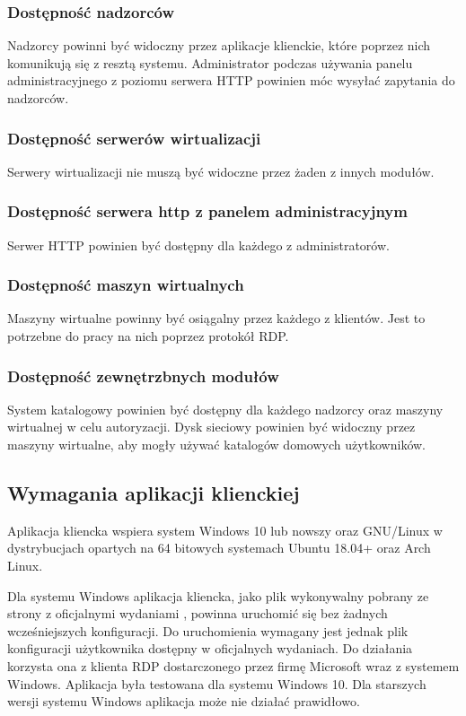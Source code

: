 \documentclass[../opis-rozwiazania.tex]{subfiles}
\begin{document}
\subsubsection{Dostępność nadzorców}
Nadzorcy powinni być widoczny przez aplikacje klienckie, które poprzez nich komunikują się z resztą systemu.
Administrator podczas używania panelu administracyjnego z poziomu serwera HTTP powinien móc wysyłać zapytania do nadzorców.

\subsubsection{Dostępność serwerów wirtualizacji}
Serwery wirtualizacji nie muszą być widoczne przez żaden z innych modułów.

\subsubsection{Dostępność serwera http z panelem administracyjnym}
Serwer HTTP powinien być dostępny dla każdego z administratorów.

\subsubsection{Dostępność maszyn wirtualnych}
Maszyny wirtualne powinny być osiągalny przez każdego z klientów.
Jest to potrzebne do pracy na nich poprzez protokół RDP.

\subsubsection{Dostępność zewnętrzbnych modułów}
System katalogowy powinien być dostępny dla każdego nadzorcy oraz maszyny wirtualnej w celu autoryzacji.
Dysk sieciowy powinien być widoczny przez maszyny wirtualne, aby mogły używać katalogów domowych użytkowników.

\subsection{Wymagania aplikacji klienckiej}
Aplikacja kliencka wspiera system Windows 10 lub nowszy oraz GNU/Linux w dystrybucjach opartych na 64 bitowych systemach Ubuntu 18.04+ oraz Arch Linux.

Dla systemu Windows aplikacja kliencka, jako plik wykonywalny pobrany ze strony z oficjalnymi wydaniami \parencite{ocd-client-releases}, powinna uruchomić się bez żadnych wcześniejszych konfiguracji. Do uruchomienia wymagany jest jednak plik konfiguracji użytkownika dostępny w oficjalnych wydaniach.
Do działania korzysta ona z klienta RDP dostarczonego przez firmę Microsoft wraz z systemem Windows.
Aplikacja była testowana dla systemu Windows 10.
Dla starszych wersji systemu Windows aplikacja może nie działać prawidłowo.
\end{document}
